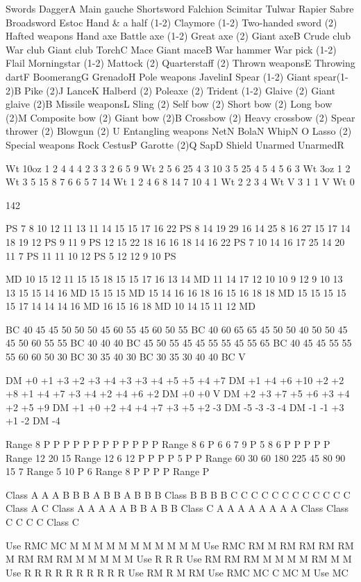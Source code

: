 \documentclass[a4paper]{article}
\begin{document}
\begin{multicols}{3}
Swords
DaggerA
Main gauche
Shortsword
Falchion
Scimitar
Tulwar
Rapier
Sabre
Broadsword
Estoc
Hand & a half (1-2)
Claymore (1-2)
Two-handed sword (2)
Hafted weapons
Hand axe
Battle axe (1-2)
Great axe (2)
Giant axeB
Crude club
War club
Giant club
TorchC
Mace
Giant maceB
War hammer
War pick (1-2)
Flail
Morningstar (1-2)
Mattock (2)
Quarterstaff (2)
Thrown weaponsE
Throwing dartF
BoomerangG
GrenadoH
Pole weapons
JavelinI
Spear (1-2)
Giant spear(1-2)B
Pike (2)J
LanceK
Halberd (2)
Poleaxe (2)
Trident (1-2)
Glaive (2)
Giant glaive (2)B
Missile weaponsL
Sling (2)
Self bow (2)
Short bow (2)
Long bow (2)M
Composite bow (2)
Giant bow (2)B
Crossbow (2)
Heavy crossbow (2)
Spear thrower (2)
Blowgun (2) U
Entangling weapons
NetN
BolaN
WhipN O
Lasso (2)
Special weapons
Rock
CestusP
Garotte (2)Q
SapD
Shield
Unarmed
UnarmedR

Wt
10oz
1
2
4
4
4
2
3
3
2
6
5
9
Wt
2
5
6
25
4
3
10
3
5
25
4
5
4
5
6
3
Wt
3oz
1
2
Wt
3
5
15
8
7
6
6
5
7
14
Wt
1
2
4
6
8
14
7
10
4
1
Wt
2
2
3
4
Wt
V
3
1
1
V
Wt
0

142

PS
7
8
10
12
11
13
11
14
15
15
17
16
22
PS
8
14
19
29
16
14
25
8
16
27
15
17
14
18
19
12
PS
9
11
9
PS
12
15
22
18
16
16
18
14
16
22
PS
7
10
14
16
17
25
14
20
11
7
PS
11
11
10
12
PS
5
12
12
9
10
PS

MD
10
15
12
11
15
15
18
15
15
17
16
13
14
MD
11
14
17
12
10
10
9
12
9
10
13
13
15
15
14
16
MD
15
15
15
MD
15
14
16
16
18
16
15
16
18
18
MD
15
15
15
15
15
17
14
14
14
16
MD
16
15
16
18
MD
10
14
15
11
12
MD

BC
40
45
45
50
50
50
45
60
55
45
60
50
55
BC
40
60
65
65
45
50
50
40
50
50
45
45
50
60
55
55
BC
40
40
40
BC
45
50
55
45
45
55
55
45
55
65
BC
40
45
45
55
55
55
60
60
50
30
BC
30
35
40
30
BC
30
35
30
40
40
BC
V

DM
+0
+1
+3
+2
+3
+4
+3
+3
+4
+5
+5
+4
+7
DM
+1
+4
+6
+10
+2
+2
+8
+1
+4
+7
+3
+4
+2
+4
+6
+2
DM
+0
+0
V
DM
+2
+3
+7
+5
+6
+3
+4
+2
+5
+9
DM
+1
+0
+2
+4
+4
+7
+3
+5
+2
-3
DM
-5
-3
-3
-4
DM
-1
-1
+3
+1
-2
DM
-4

Range
8
P
P
P
P
P
P
P
P
P
P
P
P
Range
8
6
P
6
6
7
9
P
5
8
6
P
P
P
P
P
Range
12
20
15
Range
12
6
12
P
P
P
P
5
P
P
Range
60
30
60
180
225
45
80
90
15
7
Range
5
10
P
6
Range
8
P
P
P
P
Range
P

Class
A
A
A
B
B
B
A
B
B
A
B
B
B
Class
B
B
B
B
C
C
C
C
C
C
C
C
C
C
C
C
Class
A
C
Class
A
A
A
A
A
B
B
A
B
B
Class
C
A
A
A
A
A
A
A
A
Class
Class
C
C
C
C
Class
C

Use
RMC
MC
M
M
M
M
M
M
M
M
M
M
M
Use
RMC
RM
M
RM
RM
RM
RM
M
RM
RM
RM
M
M
M
M
M
Use
R
R
R
Use
RM
RM
RM
M
M
M
M
RM
M
M
Use
R
R
R
R
R
R
R
R
R
R
Use
RM
R
M
RM
Use
RMC
MC
C
MC
M
Use
MC


\end{multicols}
\end{document}
